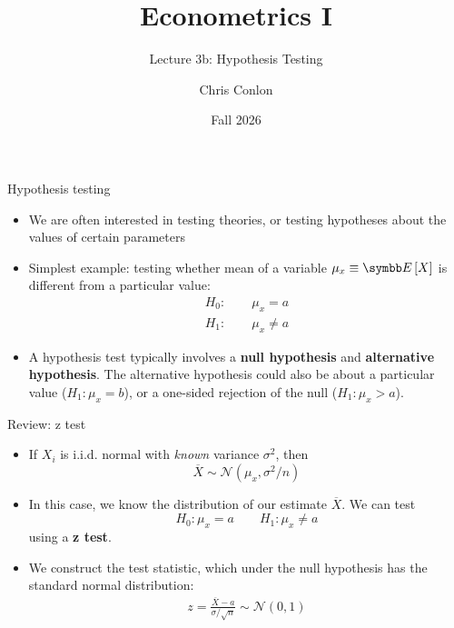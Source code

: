 \documentclass[aspectratio=169,11pt]{beamer}
\title[L4 - Inference and Standard Errors]{ Econometrics I}
\subtitle{Lecture 3b: Hypothesis Testing}
\author{Chris Conlon}
\date{Fall 2026}
\begin{document}
\maketitle





\begin{frame}{Hypothesis testing}
\begin{itemize}
	\item We are often interested in testing theories, or testing hypotheses about
	the values of certain parameters

	\medskip
	\item Simplest example: testing whether mean of a variable $\mu_x \equiv \E\left[X\right]$ 
	is different from a particular value:\[
\begin{array}{c}
H_{0}:\qquad\mu_{x}=a\\
H_{1}:\qquad\mu_{x}\ne a
\end{array}
\]

	\medskip
	\item A hypothesis test typically involves a {\bf null hypothesis} and {\bf alternative hypothesis}. 
	The alternative hypothesis could also be about a particular value ($H_{1}:\mu_{x}= b$), or 
	a one-sided rejection of the null ($H_{1}:\mu_{x}>a$).


\end{itemize}
\end{frame}



\begin{frame}{Review: z test}
\begin{itemize}
	\item If $X_i$ is i.i.d. normal with \emph{known} variance $\sigma^2$, then \[
		\overline{X} \sim \mathcal{N} \left( \mu_x, \sigma^{2}/n \right)
	\]


	\item In this case, we know the distribution of our estimate $\overline{X}$. We can test\[
H_{0}:\mu_{x}=a \qquad H_{1}:\mu_{x}\ne a
\]
using a {\bf z test}.

	\item We construct the test statistic, which under the null hypothesis has the standard normal distribution:
	\begin{align*}		z = \frac{ \overline{X} - a}{\sigma/\sqrt{n}}
	 \sim \mathcal{N} \left( 0,1\right)
	 \end{align*}
\end{itemize}
\end{frame}
\end{document}
